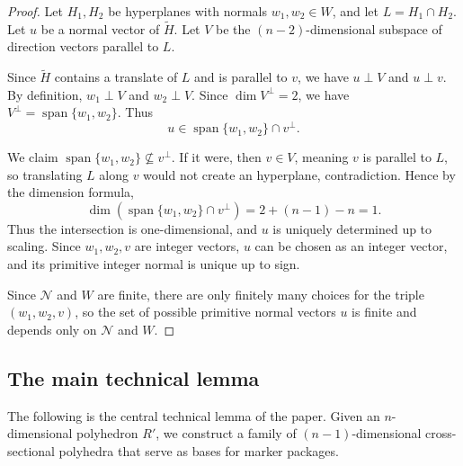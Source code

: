 \documentclass[10pt,a4paper]{amsart}
\begin{document}
\begin{proof}
Let $H_1, H_2$ be hyperplanes with normals $w_1, w_2\in W$, and let
$L=H_1\cap H_2$. Let $u$ be a normal vector of $\widetilde{H}$. Let $V$
be the $(n-2)$-dimensional subspace of direction vectors parallel to $L$.

Since $\widetilde{H}$ contains a translate of $L$ and is parallel to $v$,
we have $u\perp V$ and $u\perp v$. By definition, $w_1\perp V$ and
$w_2\perp V$. Since $\dim V^\perp=2$, we have
$V^\perp=\operatorname{span}\{w_1,w_2\}$. Thus
\[
u\in \operatorname{span}\{w_1,w_2\}\cap v^\perp.
\]

We claim $\operatorname{span}\{w_1,w_2\}\not\subseteq v^\perp$. If it were,
then $v\in V$, meaning $v$ is parallel to $L$, so translating $L$ along
$v$ would not create an hyperplane, contradiction.
Hence by the dimension formula,
\[
\dim(\operatorname{span}\{w_1,w_2\}\cap v^\perp)=2+(n-1)-n=1.
\]
Thus the intersection is one-dimensional, and $u$ is uniquely determined
up to scaling. Since $w_1, w_2, v$ are integer vectors, $u$ can be chosen
as an integer vector, and its primitive integer normal is unique up to sign.

Since $\mathcal{N}$ and $W$ are finite, there are only finitely many
choices for the triple $(w_1, w_2, v)$, so the set of possible primitive
normal vectors $u$ is finite and depends only on $\mathcal{N}$ and $W$.
\end{proof}

\subsection{The main technical lemma}

The following is the central technical lemma of the paper. Given an
$n$-dimensional polyhedron $R'$, we construct a family of
$(n-1)$-dimensional cross-sectional polyhedra that serve as bases for
marker packages.
\end{document}
